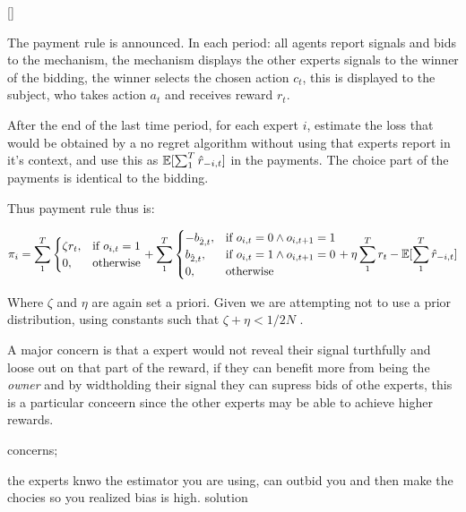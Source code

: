 \begin{mech}\label{mech:bidbandit}[]



The payment rule is announced. In each period: all agents report signals and bids to the mechanism, the mechanism displays the other experts signals to the winner of the bidding, the winner selects the chosen action $c_t$, this is displayed to the subject, who takes action $a_t$ and receives reward $r_t$.

After the end of the last time period, for each expert $i$, estimate the loss that would be obtained by a no regret algorithm without using that experts report in it's context, and use this as $\operatorname*{\mathbb E}[\sum_1^T \hat{r}_{-i,t}]$ in the payments. The choice part of the payments is identical to the bidding.


Thus payment rule thus is:


\[
    \pi_i =  \sum_1^T
\begin{cases}
    \zeta r_t ,& \text{if } o_{i,t} = 1\\
     0,              & \text{otherwise}
\end{cases}
+
\sum_1^T
\begin{cases}
     - b_{\hat{2},t} ,& \text{if } o_{i,t} = 0 \land o_{i,t+1} = 1\\
       b_{\hat{2},t} ,& \text{if } o_{i,t} = 1 \land o_{i,t+1} = 0 \\
	   0,              & \text{otherwise}
\end{cases}
  +  \eta \sum_1^T r_t -  \expec[\sum_1^T \hat{r}_{-i,t}]
\]

 

Where $\zeta$ and $\eta$ are again set a priori. Given we are attempting not to use a prior distribution, using  constants such that  $\zeta + \eta < 1/2N$ .

\end{mech}


\begin{lem}

\end{lem}


 A major concern is that a expert would not reveal their signal turthfully and loose out on that part of the reward, if they can benefit more from being the \emph{owner} and by widtholding their signal they can supress bids of othe experts, this is a particular conceern since the other experts may be able to achieve higher rewards.  



 concerns;

 the experts knwo the estimator you are using, can outbid you and then make the chocies so you realized bias is high. solution 
